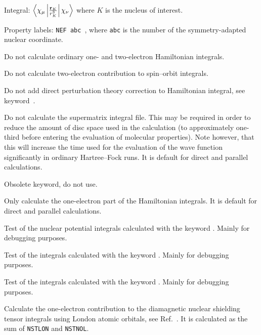 \begin{description}
\begin{list}{}{}
\item Integral:
$\left<\chi_{\mu}\left|\frac{{\bf r}_K}{r_{K}^3}\right|\chi_{\nu}\right>$
where $K$ is the nucleus of interest.
\item Property labels: \verb|NEF abc |, where \verb|abc| is the number
of the symmetry-adapted nuclear coordinate.
\end{list}

\item[\Key{NO HAM}] Do not calculate ordinary one- and two-electron
  Hamiltonian integrals.

\item[\Key{NO2SO}] Do not calculate two-electron contribution to
  spin--orbit integrals.

\item[\Key{NOPICH}] Do not add direct perturbation theory correction
  to Hamiltonian integral, see keyword~.

\item[\Key{NOSUP}] Do not calculate the supermatrix
integral file.
This may be required in order to reduce the amount of disc space used
in the calculation (to approximately one-third before entering the
evaluation of molecular properties).
Note however, that this will increase the time used for the evaluation
of the wave function
significantly in ordinary Hartree--Fock runs. It is default for direct and
parallel calculations.

\item[\Key{NOTV12}] Obsolete keyword, do not use.

\item[\Key{NOTWO}] Only calculate the one-electron part of the
Hamiltonian integrals. It is default for direct and parallel calculations.

\item[\Key{NPOTST}] Test of the nuclear potential integrals
calculated with the keyword . Mainly for debugging
purposes.

\item[\Key{NSLTST}] Test of the integrals calculated with the
keyword . Mainly for debugging purposes.

\item[\Key{NSNLTS}] Test of the integrals calculated with the
keyword . Mainly for debugging purposes.

\item[\Key{NST}] Calculate the one-electron contribution to the
diamagnetic nuclear shielding
tensor integrals using London atomic
orbitals, see Ref.~\cite{thpjjcp95}. It is
calculated as the sum of \verb|NSTLON| and \verb|NSTNOL|.


\end{description}

